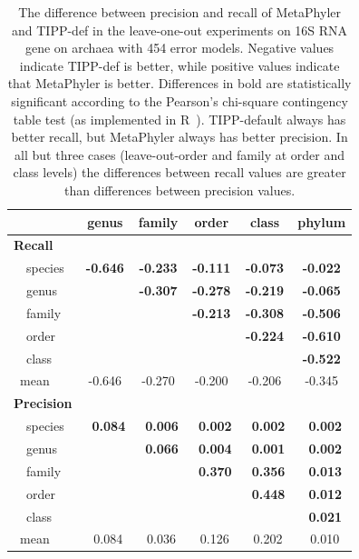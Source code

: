 \begin{table}[hptb]
\caption[Precision-Recall Differences on 16S archaea gene, 454]{\label{tipp:difference.leaveout.454.archea} The difference between precision and recall of MetaPhyler and TIPP-def in the leave-one-out experiments on 16S RNA
gene on archaea with 454 error models. Negative values
indicate TIPP-def is better, while positive values indicate that MetaPhyler is better.
Differences in bold are statistically significant according to the Pearson's chi-square contingency table test (as implemented in R~\cite{R}). 
TIPP-default always has better recall, but MetaPhyler always has better precision. 
In all but three cases (leave-out-order and family at order and class levels) the differences between recall values are greater than differences between precision values. }
\begin{center}
\begin{tabular}{|l||c|c|c|c|c|} \hline
\multicolumn{1}{|l||}{}&\multicolumn{1}{c|}{genus}&\multicolumn{1}{c|}{family}&\multicolumn{1}{c|}{order}&\multicolumn{1}{c|}{class}&\multicolumn{1}{c|}{phylum}\\ \hline
{\bf Recall}&&&&&\\
~~species&{\bf -0.646}&{\bf -0.233}&{\bf -0.111}&{\bf -0.073}&{\bf -0.022}\\ 
~~genus&&{\bf -0.307}&{\bf -0.278}&{\bf -0.219}&{\bf -0.065}\\ 
~~family&&&{\bf -0.213}&{\bf -0.308}&{\bf -0.506}\\ 
~~order&&&&{\bf -0.224}&{\bf -0.610}\\ 
~~class&&&&&{\bf -0.522}\\ 
~mean&-0.646&-0.270&-0.200&-0.206&-0.345\\
 \hline
{\bf Precision}&&&&&\\
~~species&{\bf ~0.084}&{\bf ~0.006}&{\bf ~0.002}&{\bf ~0.002}&{\bf ~0.002}\\ 
~~genus&&{\bf ~0.066}&{\bf ~0.004}&{\bf ~0.001}&{\bf ~0.002}\\ 
~~family&&&{\bf ~0.370}&{\bf ~0.356}&{\bf ~0.013}\\ 
~~order&&&&{\bf ~0.448}&{\bf ~0.012}\\ 
~~class&&&&&{\bf ~0.021}\\ 
~mean&~0.084&~0.036&~0.126&~0.202&~0.010\\
\hline
\end{tabular}
\end{center}
\end{table}

